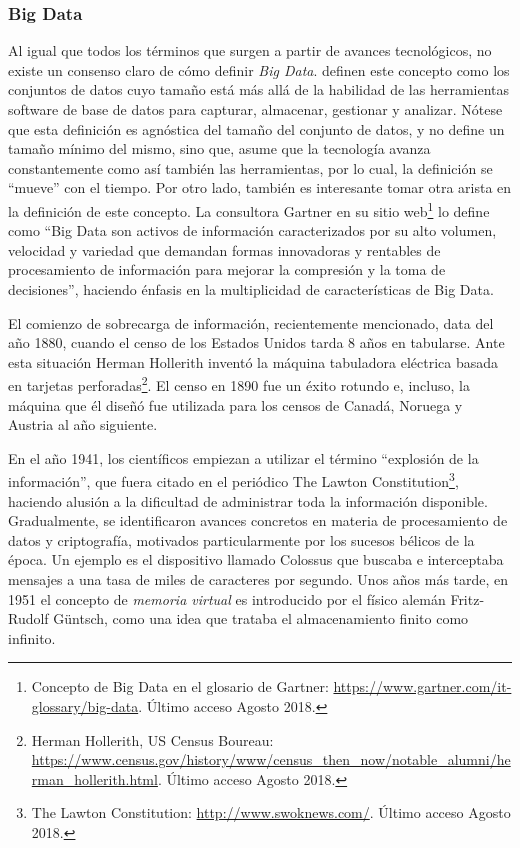 \subsubsection{Big Data}
\noindent Al igual que todos los términos que surgen a partir de avances tecnológicos, no existe un consenso claro de cómo definir \textit{Big Data}. \cite{manyika2011big} definen este concepto como los conjuntos de datos cuyo tamaño está más allá de la habilidad de las herramientas software de base de datos para capturar, almacenar, gestionar y analizar. Nótese que esta definición es agnóstica del tamaño del conjunto de datos, y no define un tamaño mínimo del mismo, sino que, asume que la tecnología avanza constantemente como así también las herramientas, por lo cual, la definición se “mueve” con el tiempo. Por otro lado, también es interesante tomar otra arista en la definición de este concepto. La consultora Gartner en su sitio web\footnote{Concepto de Big Data en el glosario de Gartner: \url{https://www.gartner.com/it-glossary/big-data}. Último acceso Agosto 2018.} lo define como “Big Data son activos de información caracterizados por su alto volumen, velocidad y variedad que demandan formas innovadoras y rentables de procesamiento de información para mejorar la compresión y la toma de decisiones”, haciendo énfasis en la multiplicidad de características de Big Data. 

\bigskip El comienzo de sobrecarga de información, recientemente mencionado, data del año 1880, cuando el censo de los Estados Unidos tarda 8 años en tabularse. Ante esta situación Herman Hollerith inventó la máquina tabuladora eléctrica basada en tarjetas perforadas\footnote{Herman Hollerith, US Census Boureau: \url{https://www.census.gov/history/www/census_then_now/notable_alumni/herman_hollerith.html}. Último acceso Agosto 2018.}. El censo en 1890 fue un éxito rotundo e, incluso, la máquina que él diseñó fue  utilizada para los censos de Canadá, Noruega y Austria al año siguiente.

\bigskip En el año 1941, los científicos empiezan a utilizar el término “explosión de la información”, que fuera  citado en el periódico The Lawton Constitution\footnote{The Lawton Constitution: \url{http://www.swoknews.com/}. Último acceso Agosto 2018.}, haciendo alusión a la dificultad de administrar toda la información disponible. Gradualmente, se identificaron avances concretos en materia de procesamiento de datos y criptografía, motivados particularmente por los sucesos bélicos de la época. Un ejemplo es el dispositivo llamado Colossus \citep{copeland2004colossus} que buscaba e interceptaba mensajes a una tasa de miles de caracteres por segundo. Unos años más tarde, en 1951 el concepto de \textit{memoria virtual} es introducido por el físico alemán Fritz-Rudolf Güntsch, como una idea que trataba el almacenamiento finito como infinito.

